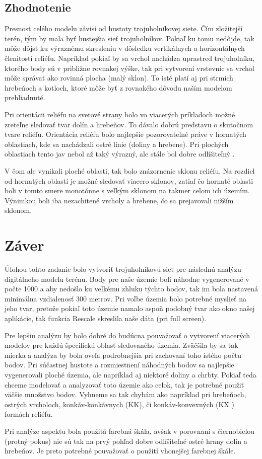 \documentclass[12pt]{article}
\begin{document}
\subsection*{Zhodnotenie}
Presnosť celého modelu závisí od hustoty trojuholníkovej siete. Čím zložitejší terén, tým by mala byť hustejšia sieť trojuholníkov. Pokiaľ ku tomu nedôjde, tak môže dôjsť ku výraznému skresleniu v dôsledku vertikálnych a horizontálnych členitostí reliéfu. Napríklad pokiaľ by sa vrchol nachádza uprastred trojuholníku, ktorého body sú v približne rovnakej výške, tak pri vytvorení vrstevníc sa vrchol môže správať ako rovinná plocha (malý sklon). To isté platí aj pri strmích hrebeňoch a kotloch, ktoré môže byť z rovnakého dôvodu naším modelom prehliadnuté. \par
Pri orientácii reliéfu na svetové strany bolo vo viacerých príkladoch možné zreteľne  sledovať tvar dolín a hrebeňov. To dávalo dobrú predstavu o skutočnom tvare reliéfu. Orientácia reliéfu bolo najlepšie pozorovateľné práve v hornatých oblastiach, kde sa nachádzali ostré línie (doliny a hrebene). Pri plochých oblastiach tento jav nebol až taký výrazný, ale stále bol dobre odlíšiteľný .\par
V čom ale vynikali ploché oblasti, tak bolo znázornenie sklonu reliéfu. Na rozdiel od hornatých oblastí je možné sledovať viacero sklonov, zatiaľ čo hornaté oblasti boli v tomto smere monotónne s veľkým sklonom na takmer celom ich územím. Výnimkou boli iba nezachitené vrcholy a hrebene, čo sa prejavovali nižším sklonom.




\newpage
\section*{Záver}
Úlohou tohto zadanie bolo vytvoriť trojuholníkovú sieť pre následnú analýzu digitálneho modelu terénu. Body pre naše územie boli náhodne vygenerované v počte 1000 a aby nedošlo ku veľkému zhluku týchto bodov, tak im bola nastavená minimálna vzdialenosť 300 metrov. Pri voľbe územia bolo potrebné myslieť na jeho tvar, pretože pokiaľ toto územie namalo aspoň podobný tvar ako okno našej aplikácie, tak funkcia Rescale skreslila naše dáta (pri full screen). \par Pre lepšiu analýzu by bolo dobré do budúcna pouvažovať o vytvorení viacerých modelov pre každú špecifickú oblasť sledovaného územia. Zväčšila by sa tak mierka a analýza by bola oveľa podrobnejšia pri zachovaní toho ístého počtu bodov. Pri súčastnej hustote a rozmiestnení náhodných bodov sa najlepšie vygenerovali ploché územia, ale napríklad aj niektoré doliny a chrbty. Pokiaľ teda chceme modelovať a analyzovať toto územie ako celok, tak je potrebné použiť väčšie množstvo bodov. Vyhneme sa tak chybám  ako napríklad pri hrebeňoch, ostrých vrcholoch, konkáv-konkávnych (KK), či  konkáv-konvexných  (KX ) formách reliéfu.\par
Pri analýze aspektu bola použitá farebná škála, avšak v porovnaní s čiernobielou (protný pokus) nie sú tak na prvý pohľad dobre odlíšiteľné ostré hrany dolín a hrebeňov. Je preto potrebné pouvažovať o použití vhonejšej farebnej škále.
\newpage
\end{document}
